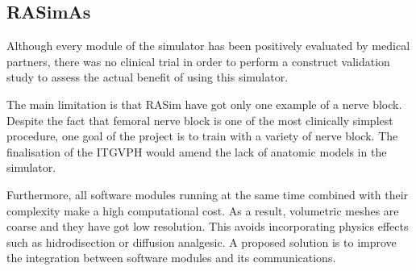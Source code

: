 \subsection{RASimAs}

Although every module of the simulator has been positively evaluated by medical partners, there was no clinical trial in order to perform a construct validation study to assess the actual benefit of using this simulator.

The main limitation is that \acs{RASim} have got only one example of a nerve block. Despite the fact that femoral nerve block is one of the most clinically simplest procedure, one goal of the project is to train with a variety of nerve block. The finalisation of the \acs{ITGVPH} would amend the lack of anatomic models in the simulator.

Furthermore, all software modules running at the same time combined with their complexity make a high computational cost. As a result, volumetric meshes are coarse and they have got low resolution. This avoids incorporating physics effects such as hidrodisection or diffusion analgesic. A proposed solution is to improve the integration between software modules and its communications.



